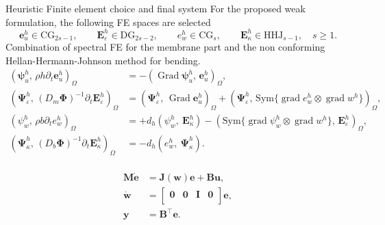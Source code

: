 \documentclass[aspectratio=169]{beamer}
\DeclareMathOperator*{\grad}{grad}
\DeclareMathOperator*{\Grad}{Grad}
\newcommand{\inpr}[3][]{\ensuremath{( #2, \, #3 )_{#1}}}
\begin{document}
\begin{frame}{Heuristic Finite element choice and final system}
	For the proposed weak formulation, the following FE spaces are selected 
	\begin{equation*}
			\bm{e}_u^h \in \mathrm{CG}_{2s-1}, \qquad
			\bm{E}_{\varepsilon}^h \in \mathrm{DG}_{2s-2}, \qquad 
			e_w^h \in \mathrm{CG}_{s}, \qquad \bm{E}_\kappa^h \in \mathrm{HHJ}_{s-1}, \quad s\ge 1.
	\end{equation*}
Combination of spectral FE for the membrane part and the non conforming Hellan-Hermann-Johnson method for bending.
\begin{equation*}
	\begin{aligned}
		\inpr[\Omega]{\bm{\psi}_u^h}{\rho h \partial_t \bm{e}_u^h} &= -\inpr[\Omega]{\Grad \bm{\psi}_u^h}{\bm{e}_u^h}, \\
		\inpr[\Omega]{\bm{\Psi}_\varepsilon^h}{(D_m \bm{\Phi})^{-1} \partial_t \bm{E}_{\varepsilon}^h} &= \inpr[\Omega]{\bm{\Psi}_\varepsilon^h}{\Grad \bm{e}_u^h} + \inpr[\Omega]{\bm{\Psi}_\varepsilon^h}{\mathrm{Sym}\{\grad e_w^h \otimes \grad w^h\}}, \\
		\inpr[\Omega]{\psi_w^h}{\rho b \partial_t {e}_w^h} &= +d_h(\psi_w^h, \ \bm{E}_{\kappa}^h) - \inpr[\Omega]{\mathrm{Sym}\{\grad \psi_w^h \otimes \grad w^h\}}{\bm{E}_\varepsilon^h}, \\ 
		\inpr[\Omega]{\bm{\Psi}_\kappa^h}{(D_b \bm{\Phi})^{-1}\partial_t {\bm{E}}_\kappa^h} &= -d_h(e_w^h, \ \bm{\Psi}_{\kappa}^h). \\ 
	\end{aligned}
\end{equation*}

\begin{tcolorbox}[nobeforeafter, colframe=theme,title=Finite dimensional system (Galerkin projection)]%
	\vspace{-.3cm}
\begin{equation*}
	\begin{aligned}
		\mathbf{M} \dot{\mathbf{e}} &= \mathbf{J}(\mathbf{w})\mathbf{e} + \mathbf{B}\mathbf{u}, \\
		\dot{\mathbf{w}} &= \begin{bmatrix}
			\mathbf{0} & \mathbf{0} & \mathbf{I} & \mathbf{0} \\
		\end{bmatrix} \mathbf{e}, \\
		\mathbf{y} &= \mathbf{B}^\top \mathbf{e}.
	\end{aligned}
\end{equation*}
\end{tcolorbox}

\end{frame}
\end{document}
